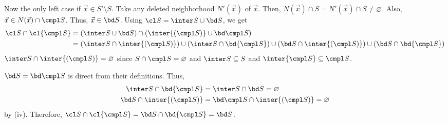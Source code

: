 \documentclass[MAS241_Note.tex]{subfiles}
\begin{document}
{\begin{enumerate}[label=(\roman*), nolistsep]
            Now the only left case if $\vec x \in S' \setminus S$.
            Take any deleted neighborhood $N'(\vec x)$ of $\vec x$.
            Then, $N(\vec x) \cap S = N'(\vec x) \cap S \neq \varnothing$.
            Also, $\vec x \in N(\vec x) \cap \cmpl S$. Thus, $\vec x \in \bd S$.
        \ii Using $\cl S = \inter S \cup \bd S$, we get \[
                \begin{aligned}[t]
                    \cl S \cap \cl{\cmpl S} & = (\inter S \cup \bd S) \cap (\inter{(\cmpl S)} \cup \bd\cmpl S) \\
                                            & = (\inter S \cap \inter{(\cmpl S)}) \cup (\inter S \cap \bd{\cmpl S}) \cup
                                                (\bd S \cap \inter{(\cmpl S)}) \cup (\bd S \cap \bd{\cmpl S})
                \end{aligned}
            \]
            $\inter S \cap \inter{(\cmpl S)} = \varnothing$ since
            $S \cap \cmpl S = \varnothing$ and $\inter S \subseteq S$ and $\inter{\cmpl S} \subseteq \cmpl S$.\par
            $\bd S = \bd \cmpl S$ is direct from their definitions. Thus, \[
                \begin{aligned}[t]
                    \inter S \cap \bd{\cmpl S}   & = \inter S \cap \bd S = \varnothing \\
                    \bd S \cap \inter{(\cmpl S)} & = \bd \cmpl S \cap \inter{(\cmpl S)} = \varnothing
                \end{aligned}
            \]
            by (iv). Therefore, $\cl S \cap \cl{\cmpl S} = \bd S \cap \bd{\cmpl S} = \bd S$.
    \end{enumerate}
}


\end{document}

